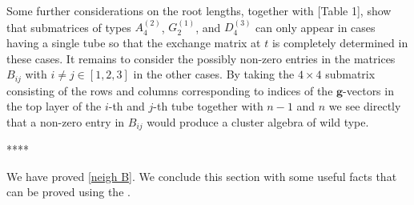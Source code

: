 \documentclass{amsart}
\theoremstyle{definition}
\theoremstyle{remark}
\numberwithin{equation}{section}
\newcommand{\0}{{\mathbf{0}}}
\newcommand{\g}{\mathbf{g}}
\begin{document}
  Some further considerations on the root lengths, together with \cite{affdenom}[Table 1], show that submatrices of types $A_{4}^{(2)}$, $G_{2}^{(1)}$, and $D_{4}^{(3)}$ can only appear in cases having a single tube so that the exchange matrix at $t$ is completely determined in these cases.
  It remains to consider the possibly non-zero entries in the matrices $B_{ij}$ with $i\neq j\in[1,2,3]$ in the other cases.
  By taking the $4\times 4$ submatrix consisting of the rows and columns corresponding to indices of the $\g$-vectors in the top layer of the $i$-th and $j$-th tube together with $n-1$ and $n$ we see directly that a non-zero entry in $B_{ij}$ would produce a cluster algebra of wild type.









****

We have proved \cref{neigh B}.
We conclude this section with some useful facts that can be proved using the .
\end{document}
